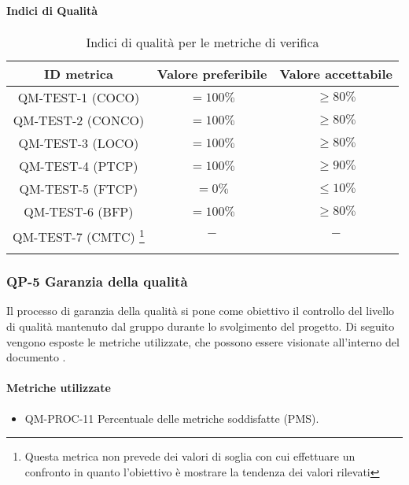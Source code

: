		\paragraph{Indici di Qualità}
			\begin{center}
				\begin{longtable}{|c|c|c|}
				\hline
				\rowcolor{lighter-grayer}
				\textbf{ID metrica} & \textbf{Valore preferibile} & \textbf{Valore accettabile}\\
				\hline
				\endfirsthead
				\hline
				QM-TEST-1 (COCO) & \(= 100\%\) & \(\geq 80\%\) \\ \hline
				QM-TEST-2 (CONCO) & \(= 100\%\) & \(\geq 80\%\) \\ \hline
				QM-TEST-3 (LOCO) & \(= 100\%\) & \(\geq 80\%\) \\ \hline
				QM-TEST-4 (PTCP) & \(= 100\%\) & \(\geq 90\%\) \\ \hline
				QM-TEST-5 (FTCP) & \(= 0\%\) & \(\le 10\%\) \\ \hline
				QM-TEST-6 (BFP) & \(= 100\%\) & \(\geq 80\%\) \\ \hline
				QM-TEST-7 (CMTC) \footnote{Questa metrica non prevede dei valori di soglia con cui effettuare un confronto in quanto l'obiettivo è mostrare la tendenza dei valori rilevati} & \(-\) & \(-\) \\ \hline
				\hline
				\caption{Indici di qualità per le metriche di verifica}
				\end{longtable}
			\end{center}
	\newpage
	\subsubsection{QP-5 Garanzia della qualità}
	
	Il processo di garanzia della qualità si pone come obiettivo il controllo del livello di qualità mantenuto dal gruppo durante lo svolgimento del progetto.
	\newline
	Di seguito vengono esposte le metriche utilizzate, che possono essere visionate all'interno del documento .
	
	\paragraph{Metriche utilizzate}
	
	\begin{itemize}
		\item QM-PROC-11 Percentuale delle metriche soddisfatte (PMS).
	\end{itemize}
	

